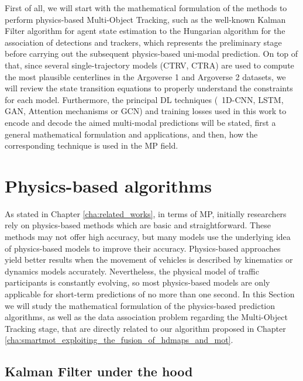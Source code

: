First of all, we will start with the mathematical formulation of the methods to perform physics-based Multi-Object Tracking, such as the well-known Kalman Filter algorithm \cite{kalman1960new} for agent state estimation to the Hungarian algorithm \cite{kuhn1955hungarian} for the association of detections and trackers, which represents the preliminary stage before carrying out the subsequent physics-based uni-modal prediction. On top of that, since several single-trajectory models (\ac{CTRV}, \ac{CTRA}) are used to compute the most plausible centerlines in the Argoverse 1 \cite{chang2019argoverse} and Argoverse 2 \cite{wilson2023argoverse} datasets, we will review the state transition equations to properly understand the constraints for each model. Furthermore, the principal \ac{DL} techniques (\eg \ 1D-\ac{CNN}, \ac{LSTM}, \ac{GAN}, Attention mechanisms or \ac{GCN}) and training losses used in this work to encode and decode the aimed multi-modal predictions will be stated, first a general mathematical formulation and applications, and then, how the corresponding technique is used in the \ac{MP} field.

\section{Physics-based algorithms}
\label{sec:3_pb_formulation}


As stated in Chapter \ref{cha:related_works}, in terms of \ac{MP}, initially researchers rely on physics-based methods which are basic and straightforward. These methods may not offer high accuracy, but many models use the underlying idea of physics-based models to improve their accuracy. Physics-based approaches yield better results when the movement of vehicles is described by kinematics or dynamics models accurately. Nevertheless, the physical model of traffic participants is constantly evolving, so most physics-based models are only applicable for short-term predictions of no more than one second. In this Section we will study the mathematical formulation of the physics-based prediction algorithms, as well as the data association problem regarding the Multi-Object Tracking stage, that are directly related to our algorithm proposed in Chapter \ref{cha:smartmot_exploiting_the_fusion_of_hdmaps_and_mot}.

\subsection{Kalman Filter under the hood}
\label{subsec:3_kf_formulation}

